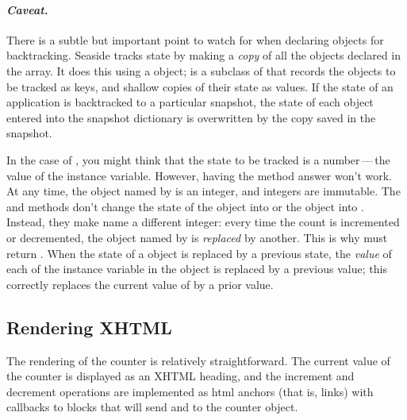 \documentclass[a4paper,10pt,twoside]{book}
\begin{document}
\paragraph{\emph{Caveat.}}
There is a subtle but important point to watch for when declaring objects for backtracking. 
Seaside tracks state by making a \emph{copy} of all the objects declared in the  array.
It does this using a
 object;  is a subclass of  that records the objects to be tracked as keys, and shallow copies of their state as values.
If the state of an application is backtracked to a particular snapshot, the state of each object entered into the snapshot dictionary is overwritten by the copy saved in the snapshot.

In the case of , you might think that the state to be tracked is a number\,---\,the value of the  instance variable.
However, having the  method answer  won't work.  
At any time, the object named by  is an integer, and integers are immutable.
The  and  methods don't change the state of the object  into  or the object  into .
Instead, they make  name a different integer: 
every time the count is incremented or decremented, the object named by  is \emph{replaced} by another.
This is why  must return .
When the state of a \mbox{} object is replaced by a previous state, the \emph{value} of each of the instance variable in the object is replaced by a previous value; this correctly replaces the current value of  by a prior value. 


\subsection{Rendering XHTML}

The rendering of the counter is relatively straightforward.
The current value of the counter is displayed as an XHTML heading, and the increment and decrement operations are implemented as html anchors (that is, links) with callbacks to blocks that will send  and  to the counter object.
\end{document}
